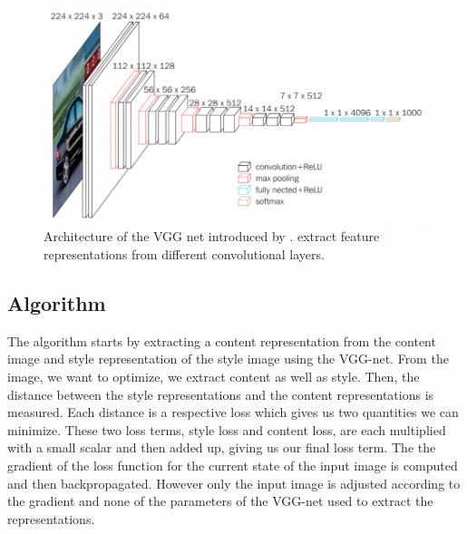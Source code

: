 \documentclass{seminar}
\begin{document}
\begin{figure} %
	\centering
	\includegraphics[scale=0.37]{vgg16.png}
	\caption{Architecture of the VGG net introduced by \cite{simonyan2014very}. \cite{gatys2015neural} extract feature representations from different convolutional layers.}
	\label{fig:vgg}
\end{figure}

\subsection{Algorithm}
The algorithm starts by extracting a content representation from the content image and style representation of the style image using the VGG-net. From the image, we want to optimize, we extract content as well as style. Then, the distance between the style representations and the content representations is measured. Each distance is a respective loss which gives us two quantities we can minimize. These two loss terms, style loss and content loss, are each multiplied with a small scalar and then added up, giving us our final loss term. The the gradient of the loss function for the current state of the input image is computed and then backpropagated. However only the input image is adjusted according to the gradient and none of the parameters of the VGG-net used to extract the representations.
\end{document}
